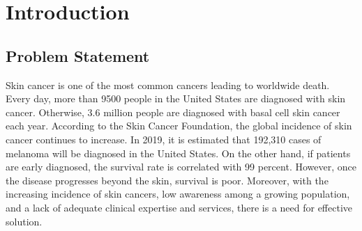 \documentclass[sensors,article,submit,pdftex,moreauthors]{Definitions/mdpi}
\begin{document}
\setcounter{section}{0} %

\section{Introduction} 
\subsection{Problem Statement}
Skin cancer is one of the most common cancers leading to worldwide death. Every day, more than 9500\cite{03358} people in the United States are diagnosed with skin cancer. Otherwise, 3.6\cite{03358} million people are diagnosed with basal cell skin cancer each year. According to the Skin Cancer Foundation, the global incidence of skin cancer continues to increase\cite{11872}. In 2019, it is estimated that 192,310 cases of melanoma will be diagnosed in the United States\cite{11872}. On the other hand, if patients are early diagnosed, the survival rate is correlated with 99 percent. However, once the disease progresses beyond the skin, survival is poor\cite{11872}. Moreover, with the increasing incidence of skin cancers, low awareness among a growing population, and a lack of adequate clinical expertise and services, there is a need for effective solution. 
\end{document}
